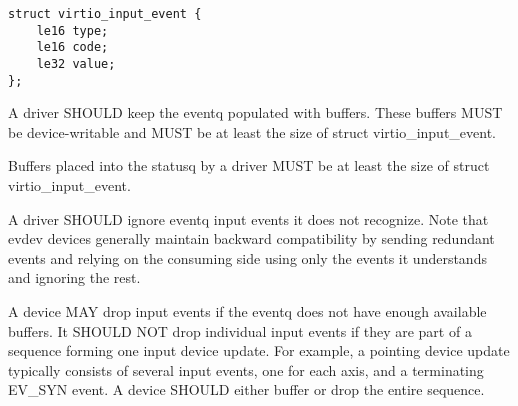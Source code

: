 \begin{lstlisting}
struct virtio_input_event {
	le16 type;
	le16 code;
	le32 value;
};
\end{lstlisting}


A driver SHOULD keep the eventq populated with buffers. These buffers
  MUST be device-writable and MUST be at least the size of
  struct virtio_input_event.

Buffers placed into the statusq by a driver MUST be at least the size
  of struct virtio_input_event.

A driver SHOULD ignore eventq input events it does not recognize. Note
  that evdev devices generally maintain backward compatibility by sending
  redundant events and relying on the consuming side using only the events
  it understands and ignoring the rest.


A device MAY drop input events if the eventq does not have enough
  available buffers. It SHOULD NOT drop individual input events if
  they are part of a sequence forming one input device update. For
  example, a pointing device update typically consists of several
  input events, one for each axis, and a terminating EV_SYN event.
  A device SHOULD either buffer or drop the entire sequence.

